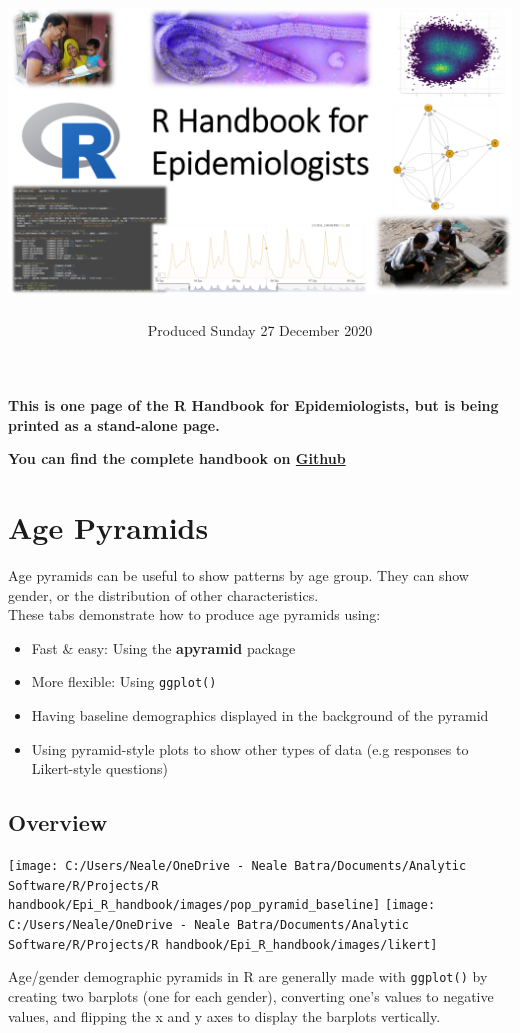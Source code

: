 \documentclass[
]{article}
\title{\includegraphics{../images/R Handbook Logo.png}}
\author{}
\date{\vspace{-2.5em}Produced Sunday 27 December 2020}
\providecommand{\tightlist}{%
  \setlength{\itemsep}{0pt}\setlength{\parskip}{0pt}}
\begin{document}
\maketitle

{
\setcounter{tocdepth}{3}
\tableofcontents
}
\textbf{This is one page of the R Handbook for Epidemiologists, but is
being printed as a stand-alone page.}

\textbf{You can find the complete handbook on
\href{https://github.com/nsbatra/Epi_R_handbook}{Github}}

\hypertarget{age_pyramid}{%
\section{Age Pyramids}\label{age_pyramid}}

Age pyramids can be useful to show patterns by age group. They can show
gender, or the distribution of other characteristics.\\
These tabs demonstrate how to produce age pyramids using:

\begin{itemize}
\tightlist
\item
  Fast \& easy: Using the \textbf{apyramid} package\\
\item
  More flexible: Using \texttt{ggplot()}\\
\item
  Having baseline demographics displayed in the background of the
  pyramid\\
\item
  Using pyramid-style plots to show other types of data (e.g responses
  to Likert-style questions)
\end{itemize}

\hypertarget{overview}{%
\subsection{Overview}\label{overview}}

\texttt{[image: C:/Users/Neale/OneDrive - Neale Batra/Documents/Analytic Software/R/Projects/R handbook/Epi\_R\_handbook/images/pop\_pyramid\_baseline]}
\texttt{[image: C:/Users/Neale/OneDrive - Neale Batra/Documents/Analytic Software/R/Projects/R handbook/Epi\_R\_handbook/images/likert]}

Age/gender demographic pyramids in R are generally made with
\texttt{ggplot()} by creating two barplots (one for each gender),
converting one's values to negative values, and flipping the x and y
axes to display the barplots vertically.
\end{document}
